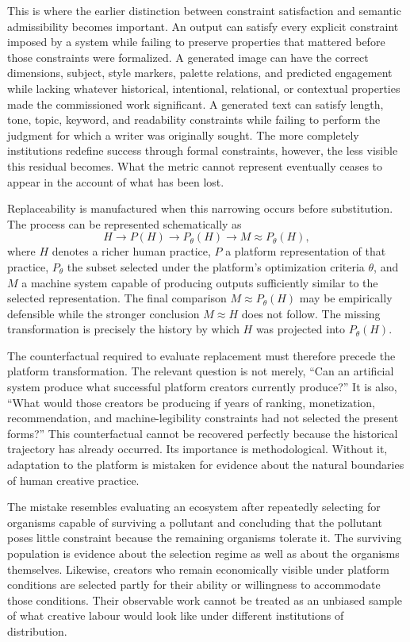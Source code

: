 \documentclass[11pt]{article}
\begin{document}
This is where the earlier distinction between constraint satisfaction and semantic admissibility becomes important. An output can satisfy every explicit constraint imposed by a system while failing to preserve properties that mattered before those constraints were formalized. A generated image can have the correct dimensions, subject, style markers, palette relations, and predicted engagement while lacking whatever historical, intentional, relational, or contextual properties made the commissioned work significant. A generated text can satisfy length, tone, topic, keyword, and readability constraints while failing to perform the judgment for which a writer was originally sought. The more completely institutions redefine success through formal constraints, however, the less visible this residual becomes. What the metric cannot represent eventually ceases to appear in the account of what has been lost.

Replaceability is manufactured when this narrowing occurs before substitution. The process can be represented schematically as
\[
H
\longrightarrow
P(H)
\longrightarrow
P_{\theta}(H)
\longrightarrow
M \approx P_{\theta}(H),
\]
where \(H\) denotes a richer human practice, \(P\) a platform representation of that practice, \(P_{\theta}\) the subset selected under the platform's optimization criteria \(\theta\), and \(M\) a machine system capable of producing outputs sufficiently similar to the selected representation. The final comparison \(M \approx P_{\theta}(H)\) may be empirically defensible while the stronger conclusion \(M \approx H\) does not follow. The missing transformation is precisely the history by which \(H\) was projected into \(P_{\theta}(H)\).

The counterfactual required to evaluate replacement must therefore precede the platform transformation. The relevant question is not merely, ``Can an artificial system produce what successful platform creators currently produce?'' It is also, ``What would those creators be producing if years of ranking, monetization, recommendation, and machine-legibility constraints had not selected the present forms?'' This counterfactual cannot be recovered perfectly because the historical trajectory has already occurred. Its importance is methodological. Without it, adaptation to the platform is mistaken for evidence about the natural boundaries of human creative practice.

The mistake resembles evaluating an ecosystem after repeatedly selecting for organisms capable of surviving a pollutant and concluding that the pollutant poses little constraint because the remaining organisms tolerate it. The surviving population is evidence about the selection regime as well as about the organisms themselves. Likewise, creators who remain economically visible under platform conditions are selected partly for their ability or willingness to accommodate those conditions. Their observable work cannot be treated as an unbiased sample of what creative labour would look like under different institutions of distribution.
\end{document}

